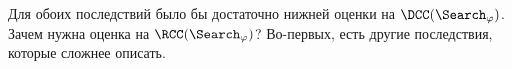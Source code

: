 Для обоих последствий было бы достаточно нижней оценки на $\DCC(\Search_{\varphi})$. Зачем нужна оценка
на $\RCC(\Search_{\varphi})$? Во-первых, есть другие последствия, которые сложнее описать.


\begin{comment}
    $f\colon \{0, 1\}^n \to A$. Для $z \in \{0, 1\}^n$ выделяем непересекающиеся блоки $\{B_i\}$ переменных
    $B_i\subseteq [n]$ со свойством: $f(z) \neq f(z^{B_i})$, где $z^{B_i}$ означает, что мы инвертируем
    все биты $z$ в позициях $B_i$. 

Block sensitivity: $bs_z(f)$ "--- максимальное количество непересекающихся блоков с таким свойством.

Пусть теперь $S$~--- отношение: $S \subseteq \{0, 1\}^n \times C$ 
Критическая точка $S$~--- $x$ такой, что $\exists! c\colon (x, c) \in S$.

Пример. Пусть 3-КНФ формула невыполнима, рассмотрим случайную подстановку. В среднем у неё будет
$\frac{1}{8}$ доля невыполненных клозов. То есть ответов для $\Search_{\varphi}$ на случайном входе будет
много, то есть случайный вход~--- не критическая точка.

Будем говорить, что функция $f \subseteq S$, если для каждого входа $x$ выбран какой-то один из
подходящих ответов. (Видимо, мы считаем, что отношение тотальное.)
(???)

Critical block sensitivity отношения $S$: $cbs(S) = \min_{f \subseteq S}\max\limits_{x\text{ ---
        критический для }S} bs_x(f)$

Мы докажем, что существуют $\varphi$ такие, что
$\RCC(\Search_{\varphi}) \ge \Omega(\RCC(\UDisj_{cbs(\Search_{\varphi}))}) \ge
\Omega(cbs(\Search_{\varphi}))$

Это не первая такая статья, были уже про функции и $bs$. $cbs$ было определено в \cite{HN12-crit}. Мы
рассмотрим доказательство через сведение, более простое.

Сначала построим формулы, для которых $cbs$ большое. Цейтинские формулы.

\begin{definition}
    Граф $k$-маршрутизируемый~--- есть $2k$ вершин таких, что для любого их разбиения на $k$ пар можно
    построить $k$ рёберно-непересекающихся путей, которые будут соединять концы этих пар.
\end{definition}


\end{comment}
